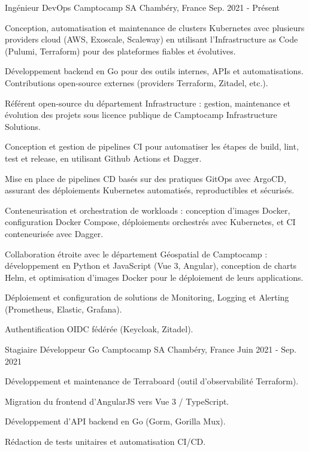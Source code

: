 \documentclass[11pt, a4paper]{awesome-cv}
\begin{document}
\begin{cventries}
  \cventry
    {Ingénieur DevOps}
    {Camptocamp SA}
    {Chambéry, France}
    {Sep. 2021 - Présent}
    {
      \vspace{2.0mm}
      \begin{cvitems}
        \item {Conception, automatisation et maintenance de clusters Kubernetes avec plusieurs providers cloud (AWS, Exoscale, Scaleway) en utilisant l'Infrastructure as Code (Pulumi, Terraform) pour des plateformes fiables et évolutives.}
        \item {Développement backend en Go pour des outils internes, APIs et automatisations. Contributions open-source externes (providers Terraform, Zitadel, etc.).}
        \item {Référent open-source du département Infrastructure : gestion, maintenance et évolution des projets sous licence publique de Camptocamp Infrastructure Solutions.}
        \item {Conception et gestion de pipelines CI pour automatiser les étapes de build, lint, test et release, en utilisant Github Actions et Dagger.}
        \item {Mise en place de pipelines CD basés sur des pratiques GitOps avec ArgoCD, assurant des déploiements Kubernetes automatisés, reproductibles et sécurisés.}
        \item {Conteneurisation et orchestration de workloads : conception d'images Docker, configuration Docker Compose, déploiements orchestrés avec Kubernetes, et CI conteneurisée avec Dagger.}
        \item {Collaboration étroite avec le département Géospatial de Camptocamp : développement en Python et JavaScript (Vue 3, Angular), conception de charts Helm, et optimisation d'images Docker pour le déploiement de leurs applications.}
        \item {Déploiement et configuration de solutions de Monitoring, Logging et Alerting (Prometheus, Elastic, Grafana).}
        \item {Authentification OIDC fédérée (Keycloak, Zitadel).}
      \end{cvitems}
    }

  \cventry
    {Stagiaire Développeur Go}
    {Camptocamp SA}
    {Chambéry, France}
    {Juin 2021 - Sep. 2021}
    {
      \vspace{2.0mm}
      \begin{cvitems}
        \item {Développement et maintenance de Terraboard (outil d'observabilité Terraform).}
        \item {Migration du frontend d'AngularJS vers Vue 3 / TypeScript.}
        \item {Développement d'API backend en Go (Gorm, Gorilla Mux).}
        \item {Rédaction de tests unitaires et automatisation CI/CD.}
      \end{cvitems}
    }


\end{cventries}
\end{document}
